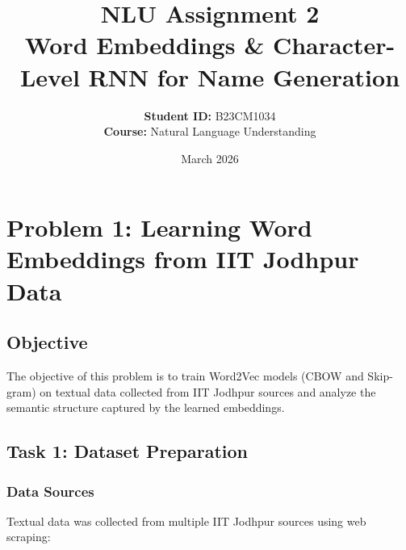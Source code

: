 \documentclass[12pt,a4paper]{article}
\title{
    \textbf{NLU Assignment 2} \\
    \large Word Embeddings \& Character-Level RNN for Name Generation
}
\author{
    \textbf{Student ID:} B23CM1034 \\
    \textbf{Course:} Natural Language Understanding
}
\date{March 2026}
\begin{document}
\maketitle
\tableofcontents
\newpage

\section{Problem 1: Learning Word Embeddings from IIT Jodhpur Data}

\subsection{Objective}

The objective of this problem is to train Word2Vec models (CBOW and Skip-gram) on textual data collected from IIT Jodhpur sources and analyze the semantic structure captured by the learned embeddings.

\subsection{Task 1: Dataset Preparation}

\subsubsection{Data Sources}

Textual data was collected from multiple IIT Jodhpur sources using web scraping:
\end{document}
